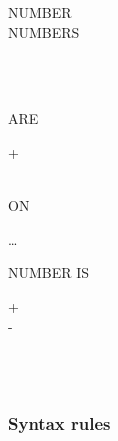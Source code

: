 \begin{syntax}
  \begin{1=}
    \begin{0-1}
      NUMBER \\
      NUMBERS
    \end{0-1}
    \begin{0-1}
       \\
    \end{0-1}\\

     ARE
  \end{1=}
  \begin{1=}
    \begin{0-1}
      + \\
    \end{0-1}
    \integer \\
    ON  
  \end{1=}\ldots
\end{syntax}

\begin{syntax}
   NUMBER IS
  \begin{0-1}
    + \\
    - \\
     \\
  \end{0-1}
  \begin{1=}
    \identifier \\
    \integer
  \end{1=}
\end{syntax}

\begin{syntax}[\miscextcolour]
\end{syntax}

\subsubsection{Syntax rules}

